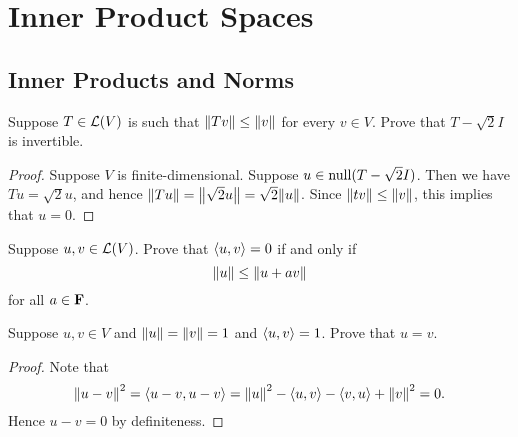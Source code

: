 \chapter{Inner Product Spaces}

\section{Inner Products and Norms}

\begin{exercise}{5}
	Suppose $T \in \operatorname{\mathcal{L}}(V)$ is such that $\norm{Tv} \le \norm{v}$ for every $v \in V$. Prove that $T-\sqrt{2}I$ is invertible.
\end{exercise}

\begin{proof}
	Suppose $V$ is finite-dimensional. Suppose $u \in \operatorname{null}(T - \sqrt{2}I)$. Then we have $Tu = \sqrt{2}u$, and hence $\norm{Tu} = \norm{\sqrt{2}u} = \sqrt{2}\norm{u}$. Since $\norm{tv} \le \norm{v}$, this implies that $u = 0$.
\end{proof}

\begin{exercise}{6}
	Suppose $u, v \in \operatorname{\mathcal{L}}(V)$. Prove that $\inp{u}{v} = 0$ if and only if
	\[
		\norm{u} \le \norm{u + av}
	\]
	for all $a \in \mathbf{F}$.
\end{exercise}

\begin{solution}
	
\end{solution}

\begin{exercise}{8}
	Suppose $u, v \in V$ and $\norm{u} = \norm{v} = 1$ and $\inp{u}{v} = 1$. Prove that $u = v$.
\end{exercise}

\begin{proof}
	Note that
	\[
		\norm{u - v}^{2} = \inp{u - v}{u - v}
		                 = \norm{u}^{2} - \inp{u}{v} - \inp{v}{u} + \norm{v}^{2}
		                 = 0.
	\]
	Hence $u - v = 0$ by definiteness.
\end{proof}

